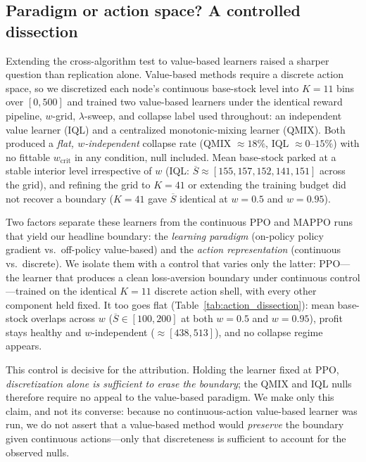 
\subsection{Paradigm or action space? A controlled dissection}
\label{sec:action_space_dissection}

Extending the cross-algorithm test to value-based learners raised a sharper
question than replication alone. Value-based methods require a discrete action
space, so we discretized each node's continuous base-stock level into $K{=}11$
bins over $[0,500]$ and trained two value-based learners under the identical
reward pipeline, $w$-grid, $\lambda$-sweep, and collapse label used throughout:
an independent value learner (IQL) and a centralized monotonic-mixing learner
(QMIX). Both produced a \emph{flat, $w$-independent} collapse rate
(QMIX ${\approx}18\%$, IQL ${\approx}0\text{--}15\%$) with no fittable
$w_{\mathrm{crit}}$ in any condition, null included. Mean base-stock parked at a
stable interior level irrespective of $w$ (IQL: $\overline{S}\approx[155,157,152,141,151]$
across the grid), and refining the grid to $K{=}41$ or extending the training
budget did not recover a boundary ($K{=}41$ gave $\overline{S}$ identical at
$w{=}0.5$ and $w{=}0.95$).

Two factors separate these learners from the continuous PPO and MAPPO runs that
yield our headline boundary: the \emph{learning paradigm} (on-policy policy
gradient vs.\ off-policy value-based) and the \emph{action representation}
(continuous vs.\ discrete). We isolate them with a control that varies only the
latter: PPO---the learner that produces a clean loss-aversion boundary under
continuous control---trained on the identical $K{=}11$ discrete action shell,
with every other component held fixed. It too goes flat
(Table~\ref{tab:action_dissection}): mean base-stock overlaps across $w$
($\overline{S}\in[100,200]$ at both $w{=}0.5$ and $w{=}0.95$), profit stays
healthy and $w$-independent ($\approx[438,513]$), and no collapse regime
appears.

This control is decisive for the attribution. Holding the learner fixed at PPO,
\emph{discretization alone is sufficient to erase the boundary}; the QMIX and IQL
nulls therefore require no appeal to the value-based paradigm. We make only this
claim, and not its converse: because no continuous-action value-based learner was
run, we do not assert that a value-based method would \emph{preserve} the
boundary given continuous actions---only that discreteness is sufficient to
account for the observed nulls.

